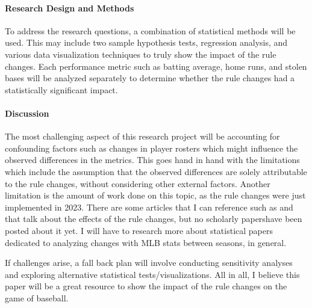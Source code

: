 \documentclass[12pt]{article}
\begin{document}
\paragraph{Research Design and Methods}
To address the research questions, a combination of statistical methods will be
used. This may include two sample hypothesis tests, regression analysis, and
various data visualization techniques to truly show the impact of the rule
changes. Each performance metric such as batting average, home runs, and stolen
bases will be analyzed separately to determine whether the rule changes had a
statistically significant impact.


\paragraph{Discussion}
The most challenging aspect of this research project will be accounting for 
confounding factors such as changes in player rosters which might influence the
observed differences in the metrics. This goes hand in hand with the limitations
which include the assumption that the observed differences are solely attributable
to the rule changes, without considering other external factors. Another limitation
is the amount of work done on this topic, as the rule changes were just implemented
in 2023. There are some articles that I can reference such as \citet{Connon} and
\citet{Castrovince} that talk about the effects of the rule changes, but no 
scholarly papershave been posted about it yet. I will have to research more about
statistical papers dedicated to analyzing changes with MLB stats between seasons, 
in general.

If challenges arise, a fall back plan will involve conducting sensitivity analyses
and exploring alternative statistical tests/visualizations. All in all, I believe
this paper will be a great resource to show the impact of the rule changes on 
the game of baseball.




\end{document}

